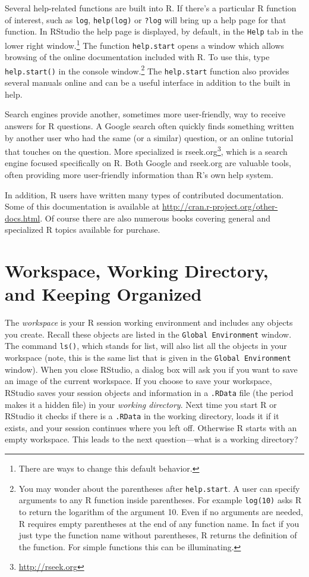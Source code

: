 \documentclass[
]{krantz}
\renewcommand{\href}[2]{#2\footnote{\url{#1}}}
\begin{document}
Several help-related functions are built into R. If there's a particular R function of interest, such as \texttt{log}, \texttt{help(log)} or \texttt{?log} will bring up a help page for that function. In RStudio the help page is displayed, by default, in the \texttt{Help} tab in the lower right window.\footnote{There are ways to change this default behavior.} The function \texttt{help.start} opens a window which allows browsing of the online documentation included with R. To use this, type \texttt{help.start()} in the console window.\footnote{You may wonder about the parentheses after \texttt{help.start}. A user can specify arguments to any R function inside parentheses. For example \texttt{log(10)} asks R to return the logarithm of the argument 10. Even if no arguments are needed, R requires empty parentheses at the end of any function name. In fact if you just type the function name without parentheses, R returns the definition of the function. For simple functions this can be illuminating.} The \texttt{help.start} function also provides several manuals online and can be a useful interface in addition to the built in help.

Search engines provide another, sometimes more user-friendly, way to receive answers for R questions. A Google search often quickly finds something written by another user who had the same (or a similar) question, or an online tutorial that touches on the question. More specialized is \href{http://rseek.org}{rseek.org}, which is a search engine focused specifically on R. Both Google and rseek.org are valuable tools, often providing more user-friendly information than R's own help system.

In addition, R users have written many types of contributed documentation. Some of this documentation is available at \url{http://cran.r-project.org/other-docs.html}. Of course there are also numerous books covering general and specialized R topics available for purchase.

\hypertarget{workspace-working-directory-and-keeping-organized}{%
\section{Workspace, Working Directory, and Keeping Organized}\label{workspace-working-directory-and-keeping-organized}}

The \emph{workspace} is your R session working environment and includes any objects you create. Recall these objects are listed in the \texttt{Global\ Environment} window. The command \texttt{ls()}, which stands for list, will also list all the objects in your workspace (note, this is the same list that is given in the \texttt{Global\ Environment} window). When you close RStudio, a dialog box will ask you if you want to save an image of the current workspace. If you choose to save your workspace, RStudio saves your session objects and information in a \texttt{.RData} file (the period makes it a hidden file) in your \emph{working directory}. Next time you start R or RStudio it checks if there is a \texttt{.RData} in the working directory, loads it if it exists, and your session continues where you left off. Otherwise R starts with an empty workspace. This leads to the next question---what is a working directory?
\end{document}
